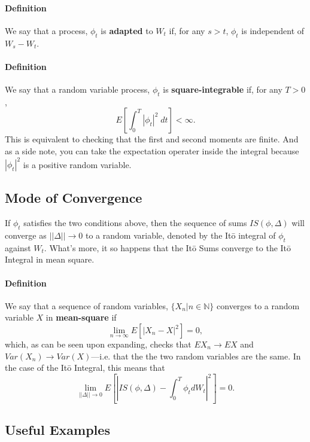 \documentclass[a4paper,12pt]{scrartcl}
\begin{document}
\paragraph{Definition} We say that a process, $\phi_t$ is 
\textbf{adapted} to $W_t$ if, for any $s > t$, $\phi_t$ is independent
of $W_s - W_t$.

\paragraph{Definition} We say that a random variable process, $\phi_t$ is
\textbf{square-integrable} if, for any $T>0$,
   \[E \left[ \int^T_0 |\phi_t|^2 \; dt \right] < \infty.\]
This is equivalent to checking that the first and second moments are
finite.  
And as a side note, you can take the expectation operater inside the 
integral because $|\phi_t|^2$ is a positive random variable.

\subsection{Mode of Convergence}

If $\phi_t$ satisfies the two conditions above, then the sequence of 
sums $IS(\phi, \Delta)$ will converge as $||\Delta||\rightarrow 0$ to a 
random variable, denoted by the It\={o} integral of $\phi_t$ against
$W_t$. What's more, it so happens that the It\={o} Sums converge to 
the It\={o} Integral in mean square.

\paragraph{Definition} We say that a sequence of random variables, 
$\{ X_n | n \in \mathbb{N} \}$ converges to a random variable $X$ in 
\textbf{mean-square} if
   \[\lim_{n \rightarrow \infty} E\left[ |X_n - X|^2 \right] = 0, \]
which, as can be seen upon expanding, checks that $EX_n \rightarrow
EX$ and $Var(X_n) \rightarrow Var(X)$---i.e. that the the two random 
variables are the same. 
In the case of the It\={o} Integral, this means that 
   \[\lim_{||\Delta||\rightarrow 0} E \left[ \left\lvert IS(\phi, \Delta)
      - \int_0^T \phi_t dW_t \right\rvert^2 \right] = 0.\]

\subsection{Useful Examples}
\end{document}
